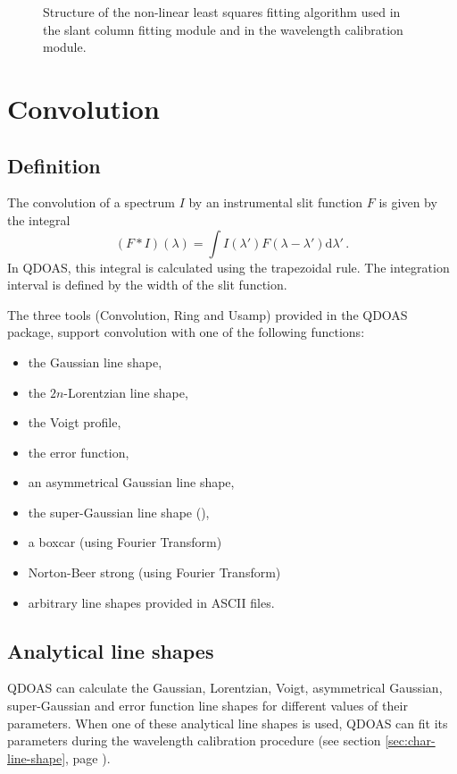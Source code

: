 \begin{figure}
  \centerline{}
  \caption{Structure of the non-linear least squares fitting algorithm
    used in the slant column fitting module and in the wavelength
    calibration module.}
  \label{fig:least_squares}
\end{figure}
\FloatBarrier

\section{Convolution}\label{sec:convolution}
\subsection{Definition}\label{sec:conv_definition}
The convolution of a spectrum $I$ by an instrumental slit function $F$
is given by the integral
\begin{equation}
  \label{eq:convolution}
  (F \ast I)(\lambda) = \int I(\lambda') F(\lambda-\lambda') \mathrm{d}\lambda'\,.
\end{equation}
In QDOAS, this integral is calculated using the trapezoidal rule. The
integration interval is defined by the width of the slit function.

The three tools (Convolution, Ring and Usamp) provided in the QDOAS
package, support convolution with one of the following functions:
\begin{itemize} \itemsep -6pt
\item the Gaussian line shape,
\item the $2n$-Lorentzian line shape,
\item the Voigt profile,
\item the error function,
\item an asymmetrical Gaussian line shape,
\item the super-Gaussian line shape (\citep{Beirle2017}),
\item a boxcar (using Fourier Transform) %
\item Norton-Beer strong (using Fourier Transform)
\item arbitrary line shapes provided in ASCII files.
\end{itemize}

\subsection{Analytical line shapes}\label{sec:analyt-line-shap}
QDOAS can calculate the Gaussian, Lorentzian, Voigt, asymmetrical Gaussian, super-Gaussian and
error function line shapes for different values of their parameters.
When one of these analytical line shapes is used, QDOAS can fit its
parameters during the wavelength calibration procedure (see section
\ref{sec:char-line-shape}, page \pageref{sec:char-line-shape}).

